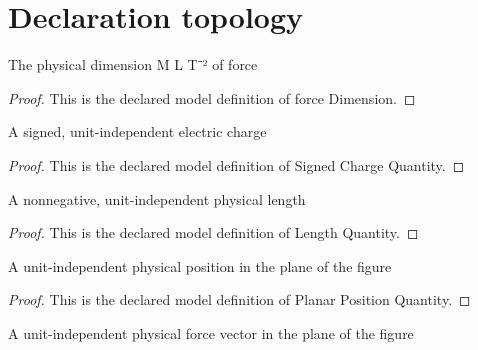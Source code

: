\section{Declaration topology}
\begin{definition}
  \label{def:physics:phyx-mini-0890:phyxminiproblems-problemphyxmini0890-forcedimension}
  The physical dimension M L T⁻² of force
\end{definition}
\begin{proof}
  This is the declared model definition of force Dimension.
\end{proof}
\begin{definition}
  \label{def:physics:phyx-mini-0890:phyxminiproblems-problemphyxmini0890-signedchargequantity}
  A signed, unit-independent electric charge
\end{definition}
\begin{proof}
  This is the declared model definition of Signed Charge Quantity.
\end{proof}
\begin{definition}
  \label{def:physics:phyx-mini-0890:phyxminiproblems-problemphyxmini0890-lengthquantity}
  A nonnegative, unit-independent physical length
\end{definition}
\begin{proof}
  This is the declared model definition of Length Quantity.
\end{proof}
\begin{definition}
  \label{def:physics:phyx-mini-0890:phyxminiproblems-problemphyxmini0890-planarpositionquantity}
  A unit-independent physical position in the plane of the figure
\end{definition}
\begin{proof}
  This is the declared model definition of Planar Position Quantity.
\end{proof}
\begin{definition}
  \label{def:physics:phyx-mini-0890:phyxminiproblems-problemphyxmini0890-planarforcequantity}
  A unit-independent physical force vector in the plane of the figure
\end{definition}
